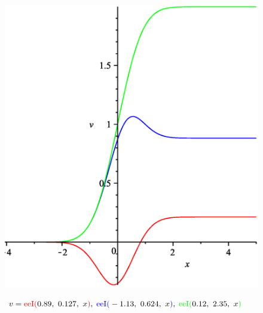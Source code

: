 \documentclass[12pt,reqno,intlimits,twoside]{amsart}
\DeclareMathOperator{\eeI}{eeI}%
\begin{document}
\newpage
\begin{figure}[!h]
  \includegraphics{ErfExpInt_x}\\
  \caption{$v=\textcolor{red}{\eeI(}0.89,\ 0.127,\ x\textcolor{red}{)},\;
              \textcolor{blue}{\eeI(}-1.13,\ 0.624,\ x\textcolor{blue}{)},\;
              \textcolor{green}{\eeI(}0.12,\ 2.35,\ x\textcolor{green}{)}
           $
          }\label{FigErfExpInt_x}
\end{figure}
\end{document}
